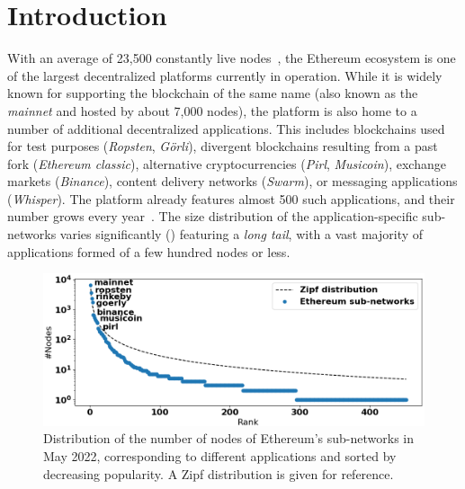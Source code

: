 
\vspace{-1mm}
\section{Introduction}
\vspace{-2mm}

With an average of 23,500 constantly live nodes~\cite{discv4-dns-lists}, the Ethereum ecosystem is one of the largest decentralized platforms currently in operation.
While it is widely known for supporting the blockchain of the same name (also known as the \emph{mainnet} and hosted by about 7,000 nodes), the platform is also home to a number of additional decentralized applications.
This includes blockchains used for test purposes (\emph{Ropsten}, \emph{G\"orli}), divergent blockchains resulting from a past fork (\emph{Ethereum classic}), alternative cryptocurrencies (\emph{Pirl}, \emph{Musicoin}), exchange markets (\emph{Binance}), content delivery networks (\emph{Swarm}), or messaging applications (\emph{Whisper}).
The platform already features almost 500 such applications, and their number grows every year~\cite{discv4-dns-lists}. The size distribution of the application-specific sub-networks varies significantly () featuring a \emph{long tail}, with a vast majority of applications formed of a few hundred nodes or less.

\begin{figure}[t]
    \includegraphics[width=1\linewidth]{img/ecosystem}
    \vspace{-0.15in}
    \caption{Distribution of the number of nodes of Ethereum's sub-networks in May 2022, corresponding to different applications and sorted by decreasing popularity.
    A Zipf distribution is given for reference.
    }
    \vspace{-0.20in}
    \label{fig:ecosystem}
\end{figure}

